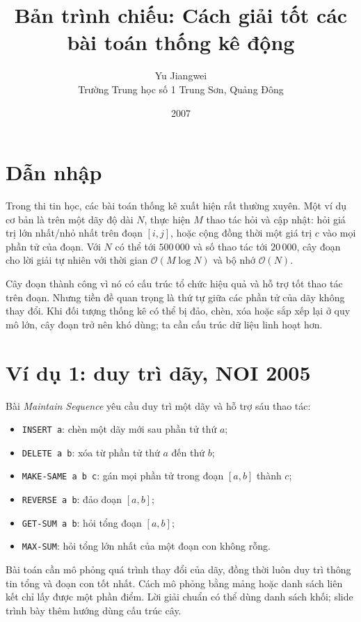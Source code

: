 \documentclass[11pt]{article}
\title{Bản trình chiếu: Cách giải tốt các bài toán thống kê động}
\author{Yu Jiangwei\\Trường Trung học số 1 Trung Sơn, Quảng Đông}
\date{2007}
\newcommand{\Oh}{\mathcal{O}}
\begin{document}
\maketitle


\section{Dẫn nhập}

Trong thi tin học, các bài toán thống kê xuất hiện rất thường xuyên. Một ví dụ
cơ bản là trên một dãy độ dài \(N\), thực hiện \(M\) thao tác hỏi và cập nhật:
hỏi giá trị lớn nhất/nhỏ nhất trên đoạn \([i,j]\), hoặc cộng đồng thời một
giá trị \(c\) vào mọi phần tử của đoạn. Với \(N\) có thể tới \(500\,000\) và
số thao tác tới \(20\,000\), cây đoạn cho lời giải tự nhiên với thời gian
\(\Oh(M\log N)\) và bộ nhớ \(\Oh(N)\).

Cây đoạn thành công vì nó có cấu trúc tổ chức hiệu quả và hỗ trợ tốt thao tác
trên đoạn. Nhưng tiền đề quan trọng là thứ tự giữa các phần tử của dãy không
thay đổi. Khi đối tượng thống kê có thể bị đảo, chèn, xóa hoặc sắp xếp lại ở
quy mô lớn, cây đoạn trở nên khó dùng; ta cần cấu trúc dữ liệu linh hoạt hơn.

\section{Ví dụ 1: duy trì dãy, NOI 2005}

Bài \textit{Maintain Sequence} yêu cầu duy trì một dãy và hỗ trợ sáu thao tác:
\begin{itemize}
  \item \texttt{INSERT a}: chèn một dãy mới sau phần tử thứ \(a\);
  \item \texttt{DELETE a b}: xóa từ phần tử thứ \(a\) đến thứ \(b\);
  \item \texttt{MAKE-SAME a b c}: gán mọi phần tử trong đoạn \([a,b]\) thành
  \(c\);
  \item \texttt{REVERSE a b}: đảo đoạn \([a,b]\);
  \item \texttt{GET-SUM a b}: hỏi tổng đoạn \([a,b]\);
  \item \texttt{MAX-SUM}: hỏi tổng lớn nhất của một đoạn con không rỗng.
\end{itemize}

Bài toán cần mô phỏng quá trình thay đổi của dãy, đồng thời luôn duy trì thông
tin tổng và đoạn con tốt nhất. Cách mô phỏng bằng mảng hoặc danh sách liên kết
chỉ lấy được một phần điểm. Lời giải chuẩn có thể dùng danh sách khối; slide
trình bày thêm hướng dùng cấu trúc cây.
\end{document}
